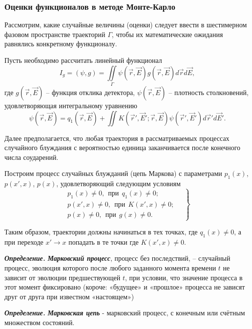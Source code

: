 \documentclass[
11pt,
master, %
subf, %
href, %
colorlinks=true, %
]{disser}
\begin{document}
\subsubsection{Оценки функционалов в методе Монте-Карло }
Рассмотрим, какие случайные величины (оценки) следует ввести в шестимерном фазовом пространстве траекторий $\Gamma $, чтобы их математические ожидания равнялись конкретному функционалу.

Пусть необходимо рассчитать линейный функционал
\begin{equation} \label{GrindEQ__18_}
I_{g} = \left(\psi, g \right) = \iint \limits _{\Gamma }\psi \left(\vec{r},\vec{E} \right) g \left(\vec{r},\vec{E} \right)d\vec{r}d\vec{E},
\end{equation}
где $g \left(\vec{r}, \vec{E} \right)$ -- функция отклика детектора, $\psi \left(\vec{r},\vec{E} \right)$ -- плотность столкновений, удовлетворяющая интегральному уравнению
\[
\psi \left(\vec{r},\vec{E} \right)=q_{1} \left(\vec{r},\vec{E} \right)+\iint K\left(\vec{r}',\vec{E}';\vec{r},\vec{E}\right)\psi \left(\vec{r}',\vec{E}' \right) d\vec{r}'d\vec{E}'.
\]

Далее предполагается, что любая траектория в рассматриваемых процессах случайного блуждания с вероятностью единица заканчивается после конечного числа соударений.

Построим процесс случайных блужданий (цепь Маркова) с параметрами $p_{1} (x)$, $p\left(x',x \right)$, $p(x)$, удовлетворяющий следующим условиям
\[\left. \begin{array}{l} {p_{1} (x)\ne 0,\;\, \text{при} \; \, q_{1} (x)\ne 0;} \\ {p(x',x)\ne 0,\;\, \text{при} \; \,  K(x',x)\ne 0;\quad } \\ {p(x)\ne 0,\;\, \text{при} \; \,  g(x)\ne 0.} \end{array}\right\}\]

Таким образом, траектории должны начинаться в тех точках, где $q_{1} (x)\ne 0$, а при переходе $x'\to x$ попадать в те точки где $K\left(x',x\right)\ne 0$.

\textbf{\textit{Определение.}} \textbf{\textit{Марковский процесс}}, процесс без последствий, -- случайный процесс, эволюция которого после любого заданного момента времени $t$ не зависит от эволюции предшествующей $t$, при условии, что значение процесса в этот момент фиксировано (короче: «будущее» и «прошлое»  процесса не зависят друг от друга при известном «настоящем»)

\textbf{\textit{Определение.}} \textbf{\textit{Марковская цепь}} - марковский процесс, с конечным или счётным множеством состояний.
\end{document}
